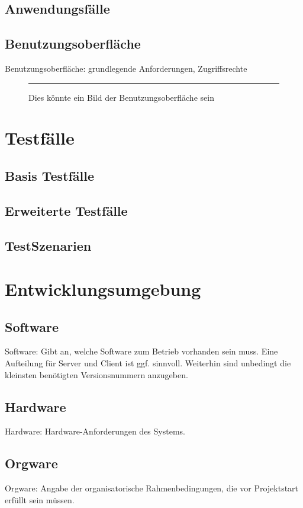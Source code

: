 \documentclass[a4paper]{scrreprt}
\begin{document}
\section{Anwendungsfälle}
\section{Benutzungsoberfläche}
Benutzungsoberfläche: grundlegende Anforderungen, Zugriffsrechte
 
\begin{figure}[ht]
  \centering
  \rule{8cm}{6cm}
  \caption{Dies könnte ein Bild der Benutzungsoberfläche sein}
\end{figure}

\chapter{Testfälle}
\section{Basis Testfälle}
\section{Erweiterte Testfälle}
\section{TestSzenarien}
 

\chapter{Entwicklungsumgebung}
 
\section{Software}
Software: Gibt an, welche Software zum Betrieb vorhanden sein muss. Eine
Aufteilung für Server und Client ist ggf. sinnvoll. Weiterhin sind unbedingt die
kleinsten benötigten Versionsnummern anzugeben.
 
\section{Hardware}
Hardware: Hardware-Anforderungen des Systems.
 
\section{Orgware}
Orgware: Angabe der organisatorische Rahmenbedingungen, die vor Projektstart
erfüllt sein müssen.
 
\printnoidxglossaries

\listoffigures
 
\end{document}
